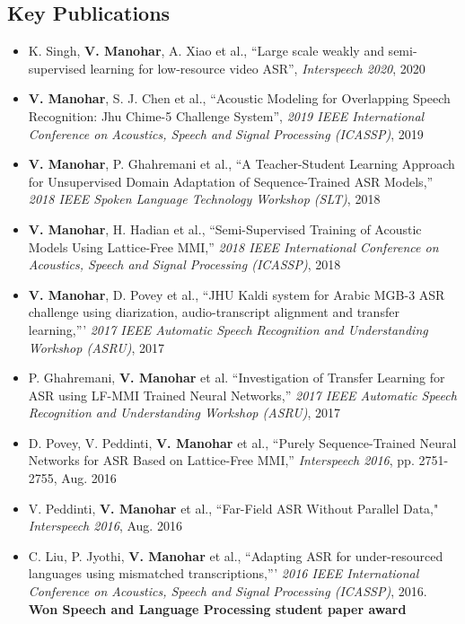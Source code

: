 \documentclass[margin,line,pifont,palatino,courier]{res}
\begin{document}
\begin{resume}
\section{\sc Key Publications}
\begin{itemize}
  \item 
  K. Singh, \textbf{V. Manohar}, A. Xiao et al., ``Large scale weakly and semi-supervised learning for low-resource video ASR'', \textit{Interspeech 2020}, 2020
  \item
  \textbf{V. Manohar}, S. J. Chen et al., ``Acoustic Modeling for Overlapping Speech Recognition: Jhu Chime-5 Challenge System'', \textit{2019 IEEE International Conference on Acoustics, Speech and Signal Processing (ICASSP)}, 2019
  \item
  \textbf{V. Manohar}, P. Ghahremani et al., ``A Teacher-Student Learning Approach for Unsupervised Domain Adaptation of Sequence-Trained ASR Models,''  \textit{2018 IEEE Spoken Language Technology Workshop (SLT)}, 2018
  \item
  \textbf{V. Manohar}, H. Hadian et al., ``Semi-Supervised Training of Acoustic Models Using Lattice-Free MMI,'' \textit{2018 IEEE International Conference on Acoustics, Speech and Signal Processing (ICASSP)}, 2018
  \item
    \textbf{V. Manohar}, D. Povey et al., ``JHU Kaldi system for Arabic MGB-3 ASR challenge using diarization, audio-transcript alignment and transfer learning,''' \textit{2017 IEEE Automatic Speech Recognition and Understanding Workshop (ASRU)}, 2017
  \item
  P. Ghahremani, \textbf{V. Manohar} et al. ``Investigation of Transfer Learning for ASR using LF-MMI Trained Neural Networks,'' \textit{2017 IEEE Automatic Speech Recognition and Understanding Workshop (ASRU)}, 2017
  \item
    D. Povey, V. Peddinti, \textbf{V. Manohar} et al., ``Purely Sequence-Trained Neural Networks for ASR Based on Lattice-Free MMI,''  \textit{Interspeech 2016}, pp. 2751-2755, Aug. 2016
  \item
    V. Peddinti, \textbf{V. Manohar} et al., ``Far-Field ASR Without Parallel Data,"
    \textit{Interspeech 2016}, Aug. 2016
  \item
    C. Liu, P. Jyothi, \textbf{V. Manohar} et al.,
    ``Adapting ASR for under-resourced languages using mismatched
    transcriptions,'''
    \textit{2016 IEEE International Conference on Acoustics, Speech and Signal Processing (ICASSP)}, 2016. 
    \textbf{Won Speech and Language Processing student paper award}

\end{itemize}
\end{resume}
\end{document}
